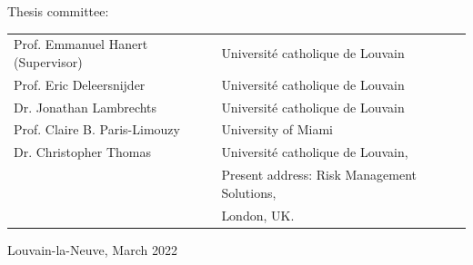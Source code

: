 \vspace*{1.5cm}
\begin{minipage}{\textwidth}
\begin{center}

\large Thesis committee:\\

\vspace*{0.5cm}
\footnotesize{
\hspace{-1cm}
\begin{tabular}{ll}
Prof. Emmanuel Hanert (Supervisor) & Université catholique de Louvain \\
Prof. Eric Deleersnijder           & Université catholique de Louvain \\
Dr. Jonathan Lambrechts            & Université catholique de Louvain\\
Prof. Claire B. Paris-Limouzy      & University of Miami \\
Dr. Christopher Thomas             & Université catholique de Louvain,\\
                                   & Present address: Risk Management Solutions,\\
                                   & London, UK. \\ 
\end{tabular}
}
\end{center}
\end{minipage}

\vspace*{.5cm}
\begin{minipage}{\textwidth}
\centering
\large Louvain-la-Neuve, March 2022
\end{minipage}
